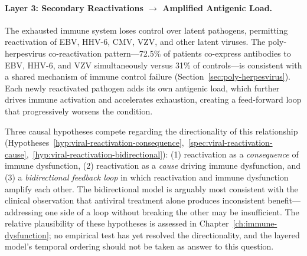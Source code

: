 \paragraph{Layer 3: Secondary Reactivations $\rightarrow$ Amplified Antigenic Load.} The exhausted immune system loses control over latent pathogens, permitting reactivation of EBV, HHV-6, CMV, VZV, and other latent viruses. The poly-herpesvirus co-reactivation pattern---72.5\% of patients co-express antibodies to EBV, HHV-6, and VZV simultaneously versus 31\% of controls---is consistent with a shared mechanism of immune control failure (Section~\ref{sec:poly-herpesvirus}). Each newly reactivated pathogen adds its own antigenic load, which further drives immune activation and accelerates exhaustion, creating a feed-forward loop that progressively worsens the condition.

Three causal hypotheses compete regarding the directionality of this relationship (Hypotheses~\ref{hyp:viral-reactivation-consequence},~\ref{spec:viral-reactivation-cause},~\ref{hyp:viral-reactivation-bidirectional}): (1) reactivation as a \emph{consequence} of immune dysfunction, (2) reactivation as a \emph{cause} driving immune dysfunction, and (3) a \emph{bidirectional feedback loop} in which reactivation and immune dysfunction amplify each other. The bidirectional model is arguably most consistent with the clinical observation that antiviral treatment alone produces inconsistent benefit---addressing one side of a loop without breaking the other may be insufficient. The relative plausibility of these hypotheses is assessed in Chapter~\ref{ch:immune-dysfunction}; no empirical test has yet resolved the directionality, and the layered model's temporal ordering should not be taken as answer to this question.

